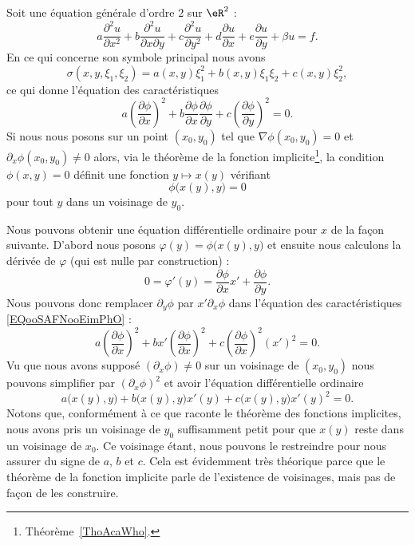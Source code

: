 Soit une équation générale d'ordre \( 2\) sur \( \eR^2\) :
\begin{equation}
	a\frac{ \partial^2 u }{ \partial x^2 }+b\frac{ \partial^2u }{ \partial x\partial y }+c\frac{ \partial^2u }{ \partial y^2 }+d\frac{ \partial u }{ \partial x }+e\frac{ \partial u }{ \partial y }+\beta u=f.
\end{equation}
En ce qui concerne son symbole principal nous avons
\begin{equation}
	\sigma(x,y,\xi_1,\xi_2)=a(x,y)\xi_1^2+b(x,y)\xi_1\xi_2+c(x,y)\xi_2^2,
\end{equation}
ce qui donne l'équation des caractéristiques
\begin{equation}        \label{EQooSAFNooEimPhO}
	a\left( \frac{ \partial \phi }{ \partial x } \right)^2+b\frac{ \partial \phi }{ \partial x }\frac{ \partial \phi }{ \partial y }+c\left( \frac{ \partial \phi }{ \partial y } \right)^2=0.
\end{equation}
Si nous nous posons sur un point \( (x_0,y_0)\) tel que \( \nabla\phi(x_0,y_0)=0\) et \( \partial_x\phi(x_0,y_0)\neq 0\) alors, via le théorème de la fonction implicite\footnote{Théorème~\ref{ThoAcaWho}.}, la condition \( \phi(x,y)=0\) définit une fonction \( y\mapsto x(y)\) vérifiant
\begin{equation}
	\phi\big( x(y),y \big)=0
\end{equation}
pour tout \( y\) dans un voisinage de \( y_0\).

Nous pouvons obtenir une équation différentielle ordinaire pour \( x\) de la façon suivante. D'abord nous posons \( \varphi(y)=\phi\big( x(y),y \big)\) et ensuite nous calculons la dérivée de \( \varphi\) (qui est nulle par construction) :
\begin{equation}
	0=\varphi'(y)=\frac{ \partial \phi }{ \partial x }x'+\frac{ \partial \phi }{ \partial y }.
\end{equation}
Nous pouvons donc remplacer \( \partial_y\phi\) par \( x'\partial_x\phi\) dans l'équation des caractéristiques \eqref{EQooSAFNooEimPhO} :
\begin{equation}
	a\left( \frac{ \partial \phi }{ \partial x } \right)^2+bx'\left( \frac{ \partial \phi }{ \partial x } \right)^2+c\left( \frac{ \partial \phi }{ \partial x } \right)^2(x')^2=0.
\end{equation}
Vu que nous avons supposé \( (\partial_x\phi)\neq 0\) sur un voisinage de \( (x_0,y_0)\) nous pouvons simplifier par \( (\partial_x\phi)^2\) et avoir l'équation différentielle ordinaire
\begin{equation}
	a\big( x(y),y \big)+b\big( x(y),y \big)x'(y)+c\big( x(y),y \big)x'(y)^2=0.
\end{equation}
Notons que, conformément à ce que raconte le théorème des fonctions implicites, nous avons pris un voisinage de \( y_0\) suffisamment petit pour que \( x(y)\) reste dans un voisinage de \( x_0\). Ce voisinage étant, nous pouvons le restreindre pour nous assurer du signe de \( a\), \( b\) et \( c\). Cela est évidemment très théorique parce que le théorème de la fonction implicite parle de l'existence de voisinages, mais pas de façon de les construire.

